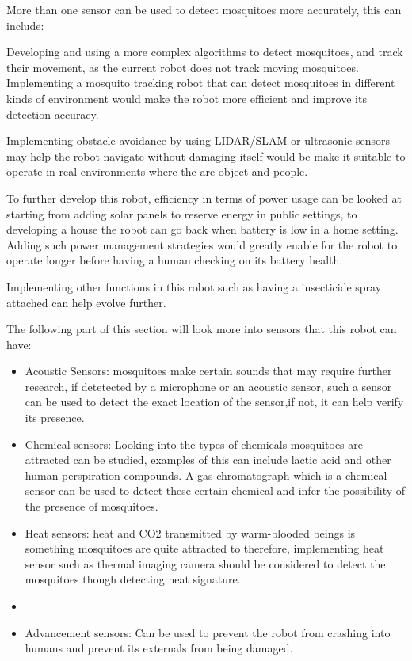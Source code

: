\documentclass[11pt]{article}
\begin{document}
More than one sensor can be used to detect mosquitoes more accurately, this can include:

Developing and using a more complex algorithms to detect mosquitoes, and track their movement, as the current robot does not track moving mosquitoes. Implementing a mosquito tracking robot that can detect mosquitoes in different kinds of environment  would make the robot more efficient and improve its detection accuracy.

Implementing obstacle avoidance by using LIDAR/SLAM or ultrasonic sensors may help the robot navigate without damaging itself would be make it suitable to operate in real environments where the are object and people. 

To further develop this robot, efficiency in terms of power usage can be looked at starting from adding solar panels to reserve energy in public settings, to developing a house the robot can go back when battery is low in a home setting. Adding such power management strategies would greatly enable for the robot to operate longer before having a human checking on its battery health.

Implementing other functions in this robot such as having a insecticide spray attached can help evolve further.

The following part of this section will look more into sensors that this robot can have:
\begin{itemize}
	\item Acoustic Sensors: mosquitoes make certain sounds that may require further research, if detetected by a microphone or an acoustic sensor, such a sensor can be used to detect the exact location of the sensor,if not, it can help verify its presence.
	
	\item Chemical sensors: Looking into the types of chemicals mosquitoes are attracted can be studied, examples of this can include lactic acid and other human perspiration compounds. A gas chromatograph which is a chemical sensor can be used to detect these certain chemical and infer the possibility of the presence of mosquitoes.
	\item 	Heat sensors: heat and CO2 transmitted by warm-blooded beings is something mosquitoes are quite attracted to therefore, implementing heat sensor such as thermal imaging camera should be considered to detect the mosquitoes though detecting heat signature. 
	\item 
	\item Advancement sensors: Can be used to prevent the robot from crashing into humans and prevent its externals from being damaged.
	\end{itemize}
\end{document}
